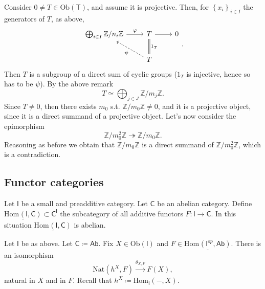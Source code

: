 \begin{ex}
\begin{itemize}
			Consider $0 \neq T \in \mathrm{Ob} \left(\mathsf{T}\right)$,
			and assume it is projective.
			Then, for $\left\{ x_i \right\}_{i \in I}$ the generators of $T$, as above,
			\begin{equation}
			\begin{tikzcd}
				\bigoplus_{i \in I} \mathbb{Z}/n_i\mathbb{Z} \arrow[r, "\varphi", rightarrow] &
				T \arrow[r, "", rightarrow] &
				0 \\
				&
				T \arrow[ul, "\psi", dashrightarrow] \arrow[u, "1_T"', equals] &
			\end{tikzcd}
			.\end{equation} 
			Then $T$ is a subgroup of a direct sum of cyclic groups
			($1_T$ is injective, hence so has to be $\psi$).
			By the above remark
			\begin{equation}
			T \simeq \bigoplus_{j \in J} \mathbb{Z}/m_j\mathbb{Z}
			.\end{equation} 
			Since $T \neq 0$, then there exists $m_0$ s.t.
			$\mathbb{Z}/m_0\mathbb{Z} \neq 0$, and it is a projective object, since
			it is a direct summand of a projective object.
			Let's now consider the epimorphism
			\begin{equation}
			\mathbb{Z}/m_0^2\mathbb{Z} \twoheadrightarrow \mathbb{Z}/m_0\mathbb{Z}
			.\end{equation} 
			Reasoning as before we obtain that $\mathbb{Z}/m_0\mathbb{Z}$ is a direct
			summand of $\mathbb{Z}/m_0^2\mathbb{Z}$, which is a contradiction.
	\end{itemize}
\end{ex} 

\subsection{Functor categories}
\begin{rem}
	Let $\mathsf{I}$ be a small and preadditive category.
	Let $\mathsf{C}$ be an abelian category.
	Define
	$\underline{\mathrm{Hom}_{\mathsf{}} \left( \mathsf{I}, \mathsf{C} \right)} 
	\subset \mathsf{C}^{\mathsf{I}}$
	the subcategory of all additive functors $F\colon \mathsf{I} \to \mathsf{C}$.
	In this situation 
	$\underline{\mathrm{Hom}_{\mathsf{}} \left( \mathsf{I}, \mathsf{C} \right)}$ is abelian.
\end{rem}

\begin{lem}[Yoneda]
	Let $\mathsf{I}$ be as above.
	Let $\mathsf{C} \coloneqq \mathsf{Ab}$.
	Fix $X \in \mathrm{Ob} \left(\mathsf{I}\right)$ and
	$F \in \underline{\mathrm{Hom}_{\mathsf{}} \left( \mathsf{I}^{op}, \mathsf{Ab} \right)}$.
	There is an isomorphism
	\begin{equation}
	\mathrm{Nat} \left( h^X, F \right) \xrightarrow{\theta_{X,F}} 
	F(X)
	,\end{equation} 
	natural in $X$ and in $F$.
	Recall that $h^X \coloneqq \mathrm{Hom}_{\mathsf{I}} \left( -, X \right)$.
\end{lem} 

